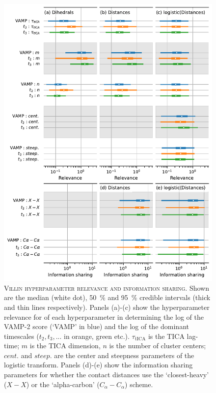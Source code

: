 \documentclass{article}
\begin{document}
\begin{figure}[h]
    \centering
    \includegraphics[height=0.8\textheight]{figures/sensitivities/2f4k_sensitivity.pdf}
    \caption{\textsc{Villin hyperparameter relevance and information sharing}. Shown are the  median (white dot), \SI{50}{\percent} and \SI{95}{\percent} credible intervals (thick and thin lines respectively).  Panels (a)-(c) show the hyperparameter relevance for of each hyperparameter in determining the log of the VAMP-2 score (`VAMP' in blue) and the log of the dominant timescales ($t_{2}, t_{3}, ...$ in orange, green etc.). $\tau_{\mathrm{tICA}}$ is the TICA lag-time; $m$ is the TICA dimension, $n$ is the number of cluster centers; $cent.$ and $steep.$ are the center and steepness parameters of the logistic transform. Panels (d)-(e) show the information sharing parameters for whether the contact distances use the `closest-heavy' ($X-X$) or the `alpha-carbon' ($C_{\alpha}-C_{\alpha}$) scheme.  }
    \label{fig:2f4k_sense}
\end{figure}
\end{document}
